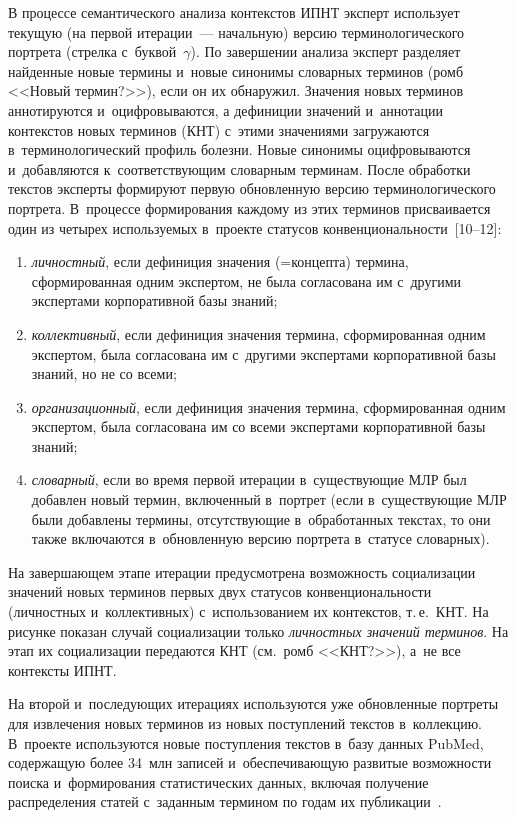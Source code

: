 \begin{multicols}{2}
  В процессе семантического анализа контекстов ИПНТ эксперт использует 
текущую (на первой итерации~--- начальную) версию терминологического 
портрета (стрелка с~буквой~$\gamma$). По завершении анализа эксперт 
разделяет найденные новые термины и~новые синонимы словарных терминов 
(ромб <<Новый термин?>>), если он их обнаружил. Значения новых 
терминов аннотируются и~оцифровываются, а дефиниции значений 
и~аннотации контекстов новых терминов (КНТ) с~этими значениями 
загружаются в~терминологический профиль болезни. Новые синонимы 
оцифровываются и~добавляются к~соответствующим словарным терминам. 
После обработки текстов эксперты формируют первую обновленную версию 
терминологического портрета. В~процессе формирования каждому из этих 
терминов присваивается один из четырех используемых в~проекте статусов 
конвенциональности~[10--12]:
  \begin{enumerate}[(1)]
  \item \textit{личностный}, если дефиниция значения (=\;кон\-цеп\-та) термина, 
сформированная одним экспертом, не была согласована им с~другими 
экспертами корпоративной базы знаний;
  \item \textit{коллективный}, если дефиниция значения термина, 
сформированная одним экспертом, была согласована им с~другими 
экспертами корпоративной базы знаний, но не со всеми;
  \item \textit{организационный}, если дефиниция значения термина, 
сформированная одним экспертом, была согласована им со всеми экспертами 
корпоративной базы знаний;
  \item \textit{словарный}, если во время первой итерации в~существующие 
МЛР был добавлен новый термин, включенный в~портрет (если 
в~существующие МЛР были добавлены термины, отсутствующие 
в~обработанных текстах, то они также включаются в~обновленную версию 
портрета в~статусе словарных).
  \end{enumerate}



  На завершающем этапе итерации предусмотрена возможность 
социализации значений новых терминов первых двух статусов 
конвенциональности (личностных и~коллективных) с~использованием их 
контекстов, т.\,е.\ КНТ. На рисунке показан случай социализации только 
\textit{личностных значений терминов}. На этап их социализации передаются 
КНТ (см.\ ромб <<КНТ?>>), а~не все контексты ИПНТ.
  
  На второй и~последующих итерациях используются уже обновленные 
портреты для извлечения новых терминов из новых поступлений текс\-тов\linebreak 
в~коллекцию. В~проекте используются \mbox{новые} поступления текстов в~базу 
данных PubMed, содержащую более 34~млн записей и~обеспечивающую 
развитые возможности поиска и~формирования \mbox{статистических} данных, 
включая получение распределения статей с~заданным термином по годам их 
публикации~\cite{13-zz}.
  

\end{multicols}
